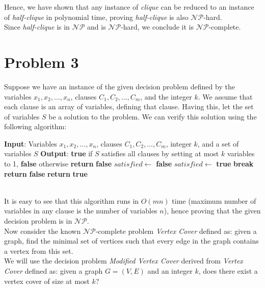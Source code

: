 \documentclass{article}
\begin{document}
  Hence, we have shown that any instance of \textit{clique} can be reduced to an instance of \textit{half-clique} in polynomial time, proving \textit{half-clique} is also $\mathcal{NP}$-hard. \\
  Since \textit{half-clique} is in $\mathcal{NP}$ and is $\mathcal{NP}$-hard, we conclude it is $\mathcal{NP}$-complete.

\section{Problem 3}
  Suppose we have an instance of the given decision problem defined by the variables $x_1, x_2, \dots, x_n$, clauses $C_1, C_2, \dots, C_m$, and the integer $k$.
  We assume that each clause is an array of variables, defining that clause.
  Having this, let the set of variables $S$ be a solution to the problem.
  We can verify this solution using the following algorithm:
  \begin{algorithm}[h!]
    \caption{Verify solution $S$ for the given decision problem}
    \begin{algorithmic}[1]
      \State \textbf{Input}: Variables $x_1, x_2, \dots, x_n$, clauses $C_1, C_2, \dots, C_m$, integer $k$, and a set of variables $S$
      \State \textbf{Output}: \textbf{true} if $S$ satisfies all clauses by setting at most $k$ variables to 1, \textbf{false} otherwise
        \State \textbf{return} \textbf{false}
      \EndIf
        \State $satisfied \gets$ \textbf{false}
            \State $satisfied \gets$ \textbf{true}
            \State \textbf{break}
          \EndIf
        \EndFor
          \State \textbf{return} \textbf{false}
        \EndIf
      \EndFor
      \State \textbf{return} \textbf{true}
    \end{algorithmic}
  \end{algorithm} \\
  It is easy to see that this algorithm runs in $O(mn)$ time (maximum number of variables in any clause is the number of variables $n$), hence proving that the given decision problem is in $\mathcal{NP}$. \\
  Now consider the known $\mathcal{NP}$-complete problem \textit{Vertex Cover} defined as: given a graph, find the minimal set of vertices such that every edge in the graph contains a vertex from this set. \\
  We will use the decision problem \textit{Modified Vertex Cover} derived from \textit{Vertex Cover} defined as: given a graph $G = (V, E)$ and an integer $k$, does there exist a vertex cover of size at most $k$?
\end{document}
